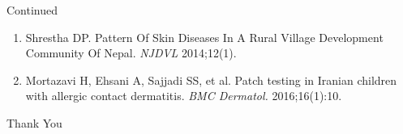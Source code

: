\documentclass[11pt]{beamer}
\newcounter{saveenumi}
\newcommand{\conti}{\setcounter{enumi}{\value{saveenumi}}}
\begin{document}
\begin{frame}{Continued}
\begin{enumerate}
\conti
\item Shrestha DP. Pattern Of Skin Diseases In A Rural Village Development Community Of Nepal. \textit{NJDVL} 2014;12(1).
\item Mortazavi H, Ehsani A, Sajjadi SS, et al. Patch testing in Iranian children with allergic contact dermatitis. \textit{BMC Dermatol.} 2016;16(1):10. 

\end{enumerate}
\end{frame}

\begin{frame}

\vspace{100pt}
\centering \huge Thank You\\
\vspace{90pt}
\noindent{\color{blue} \rule{\linewidth}{1mm} }
\end{frame}
\end{document}

